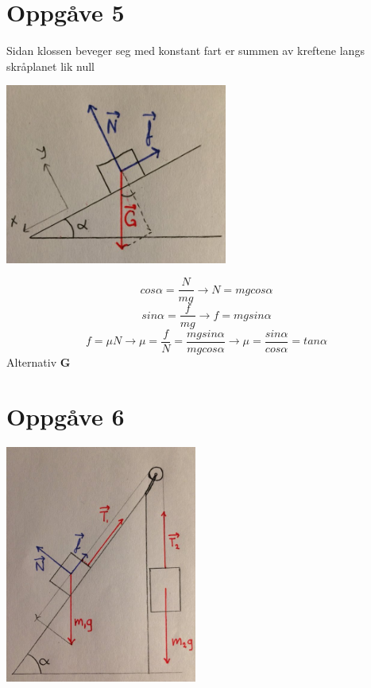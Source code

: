 \documentclass[12pt,a4paper]{article}
\begin{document}
  \section*{Oppgåve 5}
    Sidan klossen beveger seg med konstant fart er summen av kreftene
    langs skråplanet lik null
    \begin{center}
      \includegraphics[width=73mm]{02_05}
    \end{center}
    \begin{equation}
      cos\alpha = \frac{N}{mg} \rightarrow N = mgcos\alpha
    \end{equation}
    \begin{equation}
      sin\alpha = \frac{f}{mg} \rightarrow f = mgsin\alpha
    \end{equation}
    \begin{equation}
      f = \mu N \rightarrow \mu = \frac{f}{N} = \frac{mgsin\alpha}{mgcos\alpha}
      \rightarrow \mu = \frac{sin\alpha}{cos\alpha} = tan\alpha
    \end{equation}
    Alternativ \textbf{G}

  \section*{Oppgåve 6}
    \begin{center}
      \includegraphics[width=63mm]{02_06}
    \end{center}
\end{document}
